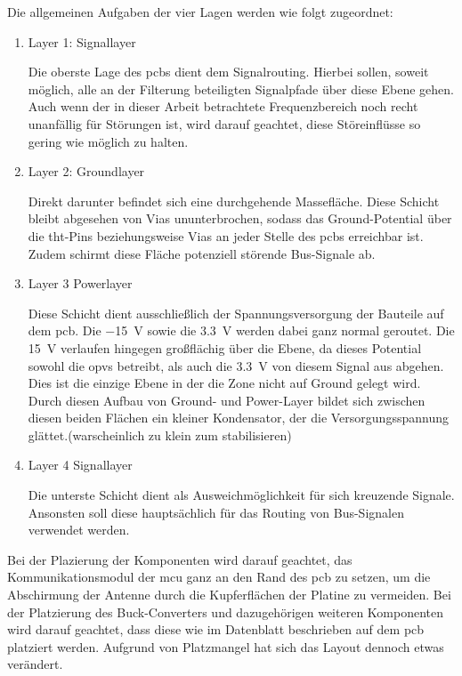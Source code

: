 \documentclass[../main_config.tex]{subfiles}
\begin{document}
Die allgemeinen Aufgaben der vier Lagen werden wie folgt zugeordnet:

\begin{enumerate}
    \item Layer 1: Signallayer \par
    Die oberste Lage des \glspl{pcb} dient dem Signalrouting. Hierbei sollen, soweit möglich, alle an der Filterung beteiligten Signalpfade über diese Ebene gehen. Auch wenn der in dieser Arbeit betrachtete Frequenzbereich noch recht unanfällig für Störungen ist, wird darauf geachtet, diese Störeinflüsse so gering wie möglich zu halten.
    \item Layer 2: Groundlayer \par
    Direkt darunter befindet sich eine durchgehende Massefläche. Diese Schicht bleibt abgesehen von Vias ununterbrochen, sodass das Ground-Potential über die \gls{tht}-Pins beziehungsweise Vias an jeder Stelle des \glspl{pcb} erreichbar ist. Zudem schirmt diese Fläche potenziell störende Bus-Signale ab. 
    \item Layer 3 Powerlayer \par
    Diese Schicht dient ausschließlich der Spannungsversorgung der Bauteile auf dem \gls{pcb}. Die \SI{-15}{\volt} sowie die \SI{3.3}{\volt} werden dabei ganz normal geroutet. Die \SI{+15}{\volt} verlaufen hingegen großflächig über die Ebene, da dieses Potential sowohl die \glspl{opv} betreibt, als auch die \SI{3.3}{\volt} von diesem Signal aus abgehen. Dies ist die einzige Ebene in der die Zone nicht auf Ground gelegt wird. Durch diesen Aufbau von Ground- und Power-Layer bildet sich zwischen diesen beiden Flächen ein kleiner Kondensator, der die Versorgungsspannung glättet.(warscheinlich zu klein zum stabilisieren)
    \item Layer 4 Signallayer \par
    Die unterste Schicht dient als Ausweichmöglichkeit für sich kreuzende Signale. Ansonsten soll diese hauptsächlich für das Routing von Bus-Signalen verwendet werden.
\end{enumerate}

Bei der Plazierung der Komponenten wird darauf geachtet, das Kommunikationsmodul der \gls{mcu} ganz an den Rand des \gls{pcb} zu setzen, um die Abschirmung der Antenne durch die Kupferflächen der Platine zu vermeiden. Bei der Platzierung des Buck-Converters und dazugehörigen weiteren Komponenten wird darauf geachtet, dass diese wie im Datenblatt beschrieben auf dem \gls{pcb} platziert werden. Aufgrund von Platzmangel hat sich das Layout dennoch etwas verändert.\par
\medskip
\end{document}
